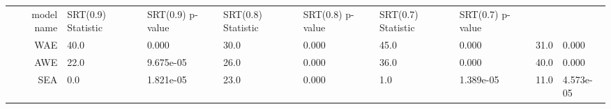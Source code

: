 \begin{tabular}{|r|l|l|l|l|l|l|}
  \hline
  model name & SRT(0.9) Statistic & SRT(0.9) p-value & SRT(0.8) Statistic & SRT(0.8) p-value & SRT(0.7) Statistic & SRT(0.7) p-value \\ 
  WAE & 40.0 & 0.000 & 30.0 & 0.000 & 45.0 & 0.000 & 31.0 & 0.000 \\ 
  AWE & 22.0 & 9.675e-05 & 26.0 & 0.000 & 36.0 & 0.000 & 40.0 & 0.000 \\ 
  SEA & 0.0 & 1.821e-05 & 23.0 & 0.000 & 1.0 & 1.389e-05 & 11.0 & 4.573e-05 \\ 
\end{tabular}
